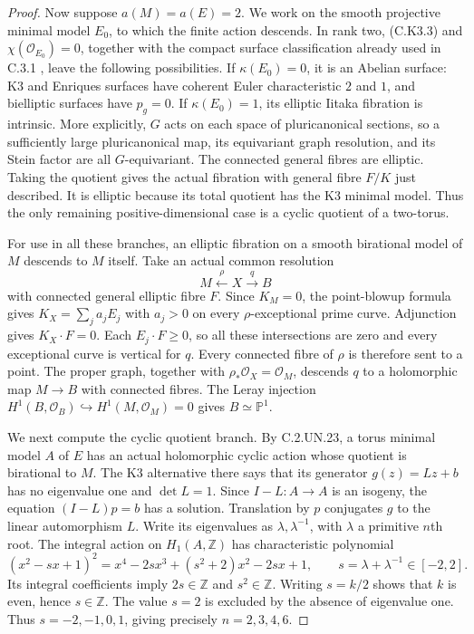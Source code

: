 \begin{proof}
Now suppose $a(M)=a(E)=2$. We work on the smooth
projective minimal model $E_0$, to which the finite
action descends. In rank two, (C.K3.3) and
$\chi(\mathcal O_{E_0})=0$, together with the compact
surface classification already used in C.3.1
\cite[Theorem~3.1]{Peters1990}, leave the following
possibilities. If $\kappa(E_0)=0$, it is an Abelian
surface: K3 and Enriques surfaces have coherent Euler
characteristic $2$ and $1$, and bielliptic surfaces have
$p_g=0$. If $\kappa(E_0)=1$, its elliptic Iitaka
fibration is intrinsic. More explicitly, $G$ acts on
each space of pluricanonical sections, so a sufficiently
large pluricanonical map, its equivariant graph resolution,
and its Stein factor are all $G$-equivariant. The
connected general fibres are elliptic. Taking the
quotient gives the actual fibration with general fibre
$F/K$ just described. It is elliptic because its total
quotient has the K3 minimal model. Thus the only
remaining positive-dimensional case is a cyclic quotient
of a two-torus.

For use in all these branches, an elliptic fibration on
a smooth birational model of $M$ descends to $M$ itself.
Take an actual common resolution
\[
                  M\xleftarrow{\rho}X\xrightarrow{q}B
                                                               \tag{C.K3.5}
\]
with connected general elliptic fibre $F$. Since $K_M=0$,
the point-blowup formula gives
$K_X=\sum_j a_jE_j$ with $a_j>0$ on every
$\rho$-exceptional prime curve. Adjunction gives
$K_X\cdot F=0$. Each $E_j\cdot F\ge0$, so all these
intersections are zero and every exceptional curve is
vertical for $q$. Every connected fibre of $\rho$ is
therefore sent to a point. The proper graph, together
with $\rho_*\mathcal O_X=\mathcal O_M$, descends $q$
to a holomorphic map $M\to B$ with connected fibres.
The Leray injection
$H^1(B,\mathcal O_B)\hookrightarrow H^1(M,\mathcal O_M)=0$
gives $B\simeq\mathbb P^1$.

We next compute the cyclic quotient branch. By
C.2.UN.23, a torus minimal model $A$ of $E$ has an
actual holomorphic cyclic action whose quotient is
birational to $M$. The K3 alternative there says that
its generator $g(z)=Lz+b$ has no eigenvalue one and
$\det L=1$. Since $I-L:A\to A$ is an isogeny, the
equation $(I-L)p=b$ has a solution. Translation by
$p$ conjugates $g$ to the linear automorphism $L$.
Write its eigenvalues as $\lambda,\lambda^{-1}$,
with $\lambda$ a primitive $n$th root. The integral
action on $H_1(A,\mathbb Z)$ has characteristic polynomial
\[
 (x^2-sx+1)^2
   =x^4-2sx^3+(s^2+2)x^2-2sx+1,
 \qquad s=\lambda+\lambda^{-1}\in[-2,2].
                                                               \tag{C.K3.6}
\]
Its integral coefficients imply $2s\in\mathbb Z$
and $s^2\in\mathbb Z$. Writing $s=k/2$ shows that
$k$ is even, hence $s\in\mathbb Z$. The value $s=2$
is excluded by the absence of eigenvalue one.
Thus $s=-2,-1,0,1$, giving precisely
$n=2,3,4,6$.


\end{proof}
